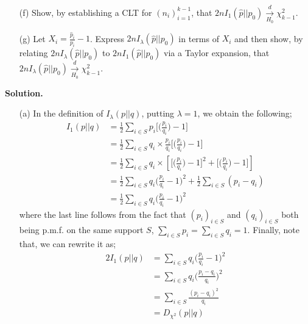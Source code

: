 \documentclass[12pt]{article}
\begin{document}
\begin{enumerate}
\begin{problem}
\begin{enumerate}
\item[(f)] Show, by establishing a CLT for $(n_i)_{i = 1}^{k - 1}$, that $2nI_1(\hat{p} || p_0) \underset{H_0}{\xrightarrow{d}} \chi^2_{k - 1}$.
\item[(g)] Let $X_i = \frac{\hat{p}_i}{p_i} - 1$. Express $2n I_\lambda(\hat{p} || p_0)$ in terms of $X_i$ and then show, by relating $2n I_\lambda(\hat{p} || p_0)$ to $2n I_1(\hat{p} || p_0)$ via a Taylor expansion, that $2n I_\lambda(\hat{p} || p_0) \underset{H_0}{\xrightarrow{d}} \chi^2_{k - 1}$. 
\end{enumerate}
\end{problem}
\begin{solution}
\vskip5pt{\bf Solution.}
\begin{enumerate}
	\item[(a)] In the definition of $I_\lambda\left(p || q\right)$, putting $\lambda=1$, we obtain the following;
	\begin{align*}
		I_1\left(p || q\right) & = \frac{1}{2} \sum_{i \in S}p_i \bigg[\bigg(\frac{p_i}{q_i} \bigg) - 1\bigg]\\
		& = \frac{1}{2} \sum_{i \in S}q_i\times \frac{p_i}{q_i} \bigg[\bigg(\frac{p_i}{q_i} \bigg) - 1\bigg]\\
		& = \frac{1}{2} \sum_{i \in S}q_i \times \left[\bigg[\bigg(\frac{p_i}{q_i} \bigg) - 1\bigg]^2 + \bigg[\bigg(\frac{p_i}{q_i} \bigg) - 1\bigg]\right]\\
		& = \frac{1}{2} \sum_{i \in S}q_i \bigg(\frac{p_i}{q_i} - 1\bigg)^2 + \frac{1}{2} \sum_{i \in S} \left(p_i - q_i\right)\\
		& = \frac{1}{2} \sum_{i \in S}q_i \bigg(\frac{p_i}{q_i} - 1\bigg)^2
	\end{align*}
	where the last line follows from the fact that $(p_i)_{i \in S}$ and $(q_i)_{i \in S}$ both being p.m.f. on the same support $S$, $\sum_{i \in S}p_i = \sum_{i \in S}q_i = 1$.
	Finally, note that, we can rewrite it as;
	\begin{align*}
		2I_1\left(p || q\right) & = \sum_{i \in S}q_i \bigg(\frac{p_i}{q_i} - 1\bigg)^2 \\
		& = \sum_{i \in S}q_i \bigg(\frac{p_i - q_i}{q_i}\bigg)^2\\
		& = \sum_{i \in S}\frac{(p_i - q_i)^2}{q_i}\\
		& = D_{\chi^2}\left(p || q\right)
	\end{align*}
	

\end{enumerate}
\end{solution}
\end{enumerate}
\end{document}

